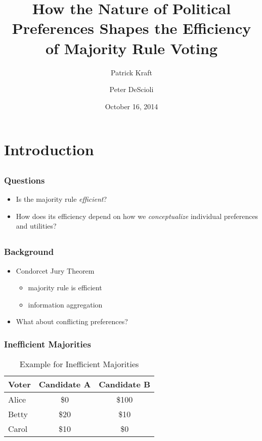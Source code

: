 \documentclass{beamer}
\author[Kraft \& DeScioli]{Patrick Kraft \and Peter DeScioli}
\institute[Stony Brook]{Center for Behavioral Political Economy}
\title[Voter Utilities and Majority Voting]{How the Nature of Political Preferences Shapes the Efficiency of Majority Rule Voting}
\date{October 16, 2014}
\begin{document}
\frame{\titlepage}


\section{Introduction}

\subsection{}
\begin{frame}%
\frametitle{Questions}
\begin{itemize}
\item Is the majority rule \emph{efficient}?
\item How does its efficiency depend on how we \emph{conceptualize} individual preferences and utilities?
\end{itemize}
\end{frame}

\subsection{}
\begin{frame}%
\frametitle{Background}
\begin{itemize}
\item Condorcet Jury Theorem
\begin{itemize}
  \item majority rule is efficient
  \item information aggregation
\end{itemize}
\item What about conflicting preferences?
\end{itemize}
\end{frame}

\begin{frame}%
\frametitle{Inefficient Majorities}
\begin{table}[c]
  \caption{Example for Inefficient Majorities}
  \begin{center}
    \begin{tabular}{lcc}
    \hline
    \textbf{Voter} & \textbf{Candidate A} & \textbf{Candidate B} \\
    \hline
       Alice & \$0 & \$100 \\
       Betty & \$20 & \$10 \\
       Carol & \$10 & \$0 \\
    \hline
    \end{tabular}
  \end{center}
\end{table}
\end{frame}
\end{document}

